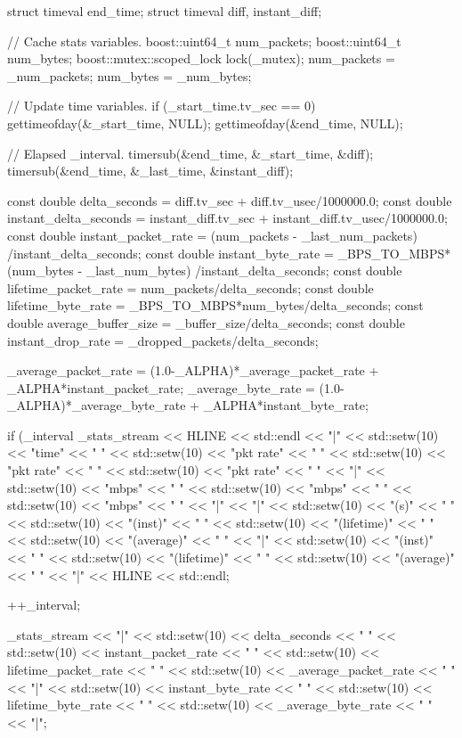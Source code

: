 \begin{DoxyCode}
                                       {
  struct timeval end_time;
  struct timeval diff, instant_diff;

  // Cache stats variables.
  boost::uint64_t num_packets;
  boost::uint64_t num_bytes;
  {
    boost::mutex::scoped_lock lock(_mutex);
    num_packets = _num_packets;
    num_bytes = _num_bytes;
  }

  // Update time variables.
  if (_start_time.tv_sec == 0) {
    gettimeofday(&_start_time, NULL);
  }
  gettimeofday(&end_time, NULL);

  // Elapsed _interval.
  timersub(&end_time, &_start_time, &diff);
  timersub(&end_time, &_last_time, &instant_diff);

  const double delta_seconds = diff.tv_sec + diff.tv_usec/1000000.0;
  const double instant_delta_seconds = instant_diff.tv_sec
    + instant_diff.tv_usec/1000000.0;
  const double instant_packet_rate = (num_packets - _last_num_packets)
    /instant_delta_seconds;
  const double instant_byte_rate = _BPS_TO_MBPS*(num_bytes - _last_num_bytes)
    /instant_delta_seconds;
  const double lifetime_packet_rate = num_packets/delta_seconds;
  const double lifetime_byte_rate = _BPS_TO_MBPS*num_bytes/delta_seconds;
  const double average_buffer_size = _buffer_size/delta_seconds;
  const double instant_drop_rate = _dropped_packets/delta_seconds;

  _average_packet_rate = (1.0-_ALPHA)*_average_packet_rate
    + _ALPHA*instant_packet_rate;
  _average_byte_rate = (1.0-_ALPHA)*_average_byte_rate
    + _ALPHA*instant_byte_rate;

  if (_interval %
    _stats_stream
      << HLINE
      << std::endl
      << "|"
      << std::setw(10) << "time" << " "
      << std::setw(10) << "pkt rate" << " "
      << std::setw(10) << "pkt rate"   << " "
      << std::setw(10) << "pkt rate"  << " "
      << "|"
      << std::setw(10) << "mbps" << " "
      << std::setw(10) << "mbps"   << " "
      << std::setw(10) << "mbps"  << " "
      << "|\n"
      << "|"
      << std::setw(10) << "(s)" << " "
      << std::setw(10) << "(inst)" << " "
      << std::setw(10) << "(lifetime)"   << " "
      << std::setw(10) << "(average)"  << " "
      << "|"
      << std::setw(10) << "(inst)" << " "
      << std::setw(10) << "(lifetime)"   << " "
      << std::setw(10) << "(average)"  << " "
      << "|\n"
      << HLINE
      << std::endl;
  }
  ++_interval;

  _stats_stream
    << "|"
    << std::setw(10) << delta_seconds << " "
    << std::setw(10) << instant_packet_rate << " "
    << std::setw(10) << lifetime_packet_rate << " "
    << std::setw(10) << _average_packet_rate << " "
    << "|"
    << std::setw(10) << instant_byte_rate << " "
    << std::setw(10) << lifetime_byte_rate << " "
    << std::setw(10) << _average_byte_rate << " "
    << "|\n";
  

\end{DoxyCode}
